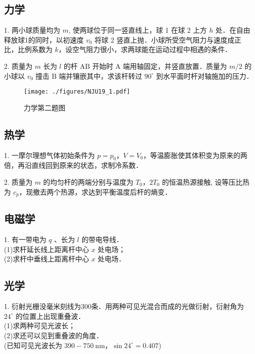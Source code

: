 \subsection{力学}
1. 两小球质量均为 $m$, 使两球位于同一竖直线上，球 1 在球 2 上方 $h$ 处．在自由释放球1的同时，以初速度 $v_{0}$ 将球 2 竖直上抛．小球所受空气阻力与速度成正比，比例系数为 $k$，设空气阻力很小，求两球能在运动过程中相遇的条件．

2. 质量为 $m$ 长为 $l$ 的杆 $\mathrm{AB}$ 开始时 $\mathrm{A}$ 端用轴固定，并竖直放置．质量为 $m / 2$ 的小球以 $v_{0}$ 撞击 $\mathrm{B}$ 端并镶嵌其中，求该杆转过 $90^{\circ}$ 到水平面时杆对轴施加的压力．
\begin{figure}[ht]
\centering
\texttt{[image: ./figures/NJU19\_1.pdf]}
\caption{力学第二题图} \label{NJU19_fig1}
\end{figure}
\subsection{热学}
1. 一摩尔理想气体初始条件为 $p=p_{0}$，$V=V_{0}$，等温膨胀使其体积变为原来的两倍，再沿直线回到原来的状态，求制冷系数．

2. 质量为 $m$ 的均匀杆的两端分别与温度为 $T_{0}$，$2T_{0}$ 的恒温热源接触, 设等压比热为 $c_{p}$，现撤去两个热源，求达到平衡温度后杆的熵变．
\subsection{电磁学}
1. 有一带电为 $q$ 、长为 $l$ 的带电导线．\\
(1)求杆延长线上距离杆中心 $x$ 处电场；\\
(2)求杆中垂线上距离杆中心 $x$ 处电场．
\subsection{光学}
1. 衍射光栅没毫米刻线为300条．用两种可见光混合而成的光做衍射，衍射角为 $24^{\circ}$ 的位置上出现重叠波．\\
(1)求两种可见光波长；\\
(2)求还可以见到重叠波的角度．\\
(已知可见光波长为 $390-750 \mathrm{~nm}$，$\sin 24^{\circ}=0.407$)
